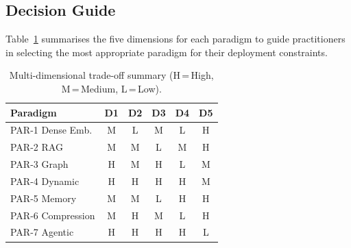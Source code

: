 \subsection{Decision Guide}
Table~\ref{tab:tradeoffs} summarises the five dimensions for each paradigm to
guide practitioners in selecting the most appropriate paradigm for their
deployment constraints.

\begin{table}[ht]
\centering
\caption{Multi-dimensional trade-off summary (H\,=\,High, M\,=\,Medium,
  L\,=\,Low).}
\label{tab:tradeoffs}
\begin{tabular}{lccccc}
\toprule
\textbf{Paradigm} & \textbf{D1} & \textbf{D2} & \textbf{D3} & \textbf{D4} & \textbf{D5} \\
\midrule
PAR-1 Dense Emb.   & M & L & M & L & H \\
PAR-2 RAG          & M & M & L & M & H \\
PAR-3 Graph        & H & M & H & L & M \\
PAR-4 Dynamic      & H & H & H & H & M \\
PAR-5 Memory       & M & M & L & H & H \\
PAR-6 Compression  & M & H & M & L & H \\
PAR-7 Agentic      & H & H & H & H & L \\
\bottomrule
\end{tabular}
\end{table}
